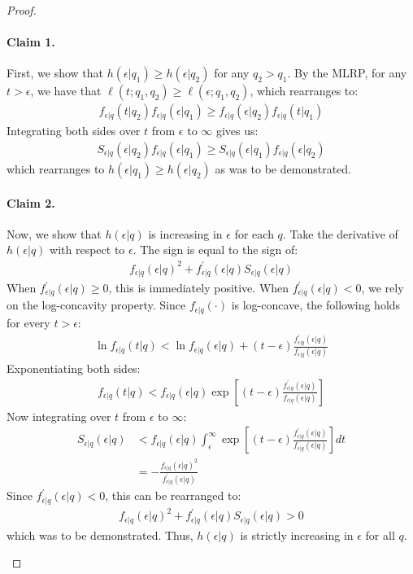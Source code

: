 \begin{proof}
\begin{enumerate}[label=(\roman*)]
\paragraph{Claim 1.} First, we show that $h(\epsilon | q_1) \geq h(\epsilon | q_2)$ for any $q_2 > q_1$. By the MLRP, for any $t > \epsilon$, we have that $\ell(t; q_1, q_2) \geq \ell(\epsilon; q_1, q_2)$, which rearranges to:
\begin{align*}
f_{\epsilon|q}(t|q_2) f_{\epsilon|q}(\epsilon|q_1) \geq f_{\epsilon|q}(\epsilon|q_2) f_{\epsilon|q}(t|q_1)
\end{align*}
Integrating both sides over $t$ from $\epsilon$ to $\infty$ gives us:
\begin{align*}
S_{\epsilon|q}(\epsilon|q_2) f_{\epsilon|q}(\epsilon|q_1) \geq S_{\epsilon|q}(\epsilon|q_1) f_{\epsilon|q}(\epsilon|q_2)
\end{align*}
which rearranges to $h(\epsilon|q_1) \geq h(\epsilon | q_2)$ as was to be demonstrated.

\paragraph{Claim 2.} Now, we show that $h(\epsilon|q)$ is increasing in $\epsilon$ for each $q$. Take the derivative of $h(\epsilon|q)$ with respect to $\epsilon$. The sign is equal to the sign of:
\begin{align*}
f_{\epsilon|q}(\epsilon|q)^2 + f^\prime_{\epsilon|q}(\epsilon|q) S_{\epsilon|q}(\epsilon|q)
\end{align*}
When $f^\prime_{\epsilon|q}(\epsilon|q) \geq 0$, this is immediately positive. When $f_{\epsilon|q}^\prime(\epsilon|q)<0$, we rely on the log-concavity property. Since $f_{\epsilon|q}(\cdot)$ is log-concave, the following holds for every $t > \epsilon$:
\begin{align*}
\ln f_{\epsilon|q} (t|q) < \ln f_{\epsilon|q}(\epsilon|q) + (t-\epsilon) \frac{f_{\epsilon|q}^\prime(\epsilon|q)}{f_{\epsilon|q}(\epsilon|q)}
\end{align*}
Exponentiating both sides:
\begin{align*}
f_{\epsilon|q} (t|q) < f_{\epsilon|q}(\epsilon|q) \exp\left[ (t-\epsilon) \frac{f_{\epsilon|q}^\prime(\epsilon|q)}{f_{\epsilon|q}(\epsilon|q)} \right]
\end{align*}
Now integrating over $t$ from $\epsilon$ to $\infty$:
\begin{align*}
S_{\epsilon|q} (\epsilon | q) &< f_{\epsilon|q}(\epsilon|q) \int_{\epsilon}^\infty \exp\left[ (t-\epsilon) \frac{f_{\epsilon|q}^\prime(\epsilon|q)}{f_{\epsilon|q}(\epsilon|q)} \right] dt \\
& = - \frac{f_{\epsilon|q}(\epsilon|q)^2}{f^\prime_{\epsilon|q}(\epsilon|q)}
\end{align*}
Since $f^\prime_{\epsilon|q}(\epsilon|q) < 0$, this can be rearranged to:
\begin{align*}
f_{\epsilon|q}(\epsilon|q)^2 + f^\prime_{\epsilon|q}(\epsilon|q) S_{\epsilon|q}(\epsilon|q) > 0
\end{align*}
which was to be demonstrated. Thus, $h(\epsilon|q)$ is strictly increasing in $\epsilon$ for all $q$.


\end{enumerate}
\end{proof}
